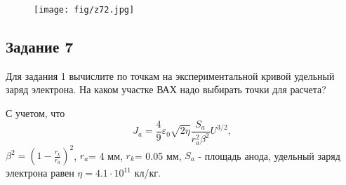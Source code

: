  \begin{figure}[H]
	\centering
	\texttt{[image: fig/z72.jpg]}
	\caption{}
	\label{fig:22}
\end{figure}
\subsection{Задание 7}
 Для задания 1 вычислите по точкам на экспериментальной кривой удельный заряд электрона. На каком участке ВАХ надо выбирать точки для расчета?

С учетом, что 
\begin{equation}
J_a=\frac49 \varepsilon_0 \sqrt{2 \eta} \frac{S_a}{r_a^2 \beta^2} U^{3/2}, 
\end{equation}
$\beta^2=(1-\frac{r_k}{r_a})^2$, $r_a$= 4 мм, $r_k$= 0.05 мм, $S_a$ - площадь анода, удельный заряд электрона равен $\eta=4.1 \cdot 10^{11}$ кл/кг.



